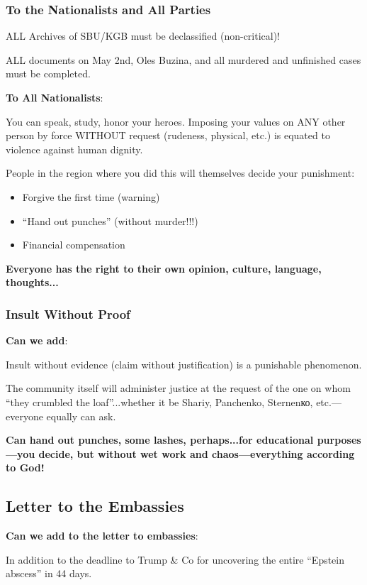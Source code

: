 \documentclass[11pt,a4paper]{article}
\theoremstyle{definition}
\theoremstyle{remark}
\begin{document}
\subsubsection{To the Nationalists and All Parties}

ALL Archives of SBU/KGB must be declassified (non-critical)!

ALL documents on May 2nd, Oles Buzina, and all murdered and unfinished cases must be completed.

\textbf{To All Nationalists}:

You can speak, study, honor your heroes. Imposing your values on ANY other person by force WITHOUT request (rudeness, physical, etc.) is equated to violence against human dignity.

People in the region where you did this will themselves decide your punishment:
\begin{itemize}
\item Forgive the first time (warning)
\item ``Hand out punches'' (without murder!!!)
\item Financial compensation
\end{itemize}

\textbf{Everyone has the right to their own opinion, culture, language, thoughts...}

\subsubsection{Insult Without Proof}

\textbf{Can we add}:

Insult without evidence (claim without justification) is a punishable phenomenon.

The community itself will administer justice at the request of the one on whom ``they crumbled the loaf''...whether it be Shariy, Panchenko, Sternenко, etc.—everyone equally can ask.

\textbf{Can hand out punches, some lashes, perhaps...for educational purposes—you decide, but without wet work and chaos—everything according to God!}

\subsection{Letter to the Embassies}

\textbf{Can we add to the letter to embassies}:

In addition to the deadline to Trump \& Co for uncovering the entire ``Epstein abscess'' in 44 days.
\end{document}
